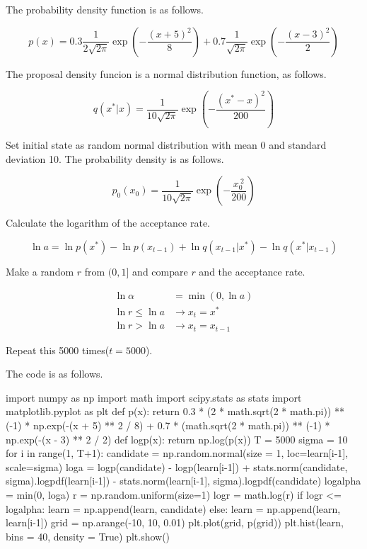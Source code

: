 \begin{example}

The probability density function is as follows.

\begin{equation}
    p(x) = 0.3 \frac{1}{2 \sqrt{2\pi}} \exp{\left(- \frac{(x + 5)^2}{8} \right)} + 0.7 \frac{1}{\sqrt{2\pi}} \exp{\left(- \frac{(x - 3)^2}{2} \right)}
\end{equation}

The proposal density funcion is a normal distribution function, as follows.

\begin{equation}
    q(x^* | x) = \frac{1}{10\sqrt{2\pi}} \exp{\left( -\frac{(x^* - x)^2}{200} \right)}
\end{equation}

Set initial state as random normal distribution with mean 0 and standard deviation 10. The probability density is as follows.

\begin{equation}
    p_0 (x_0) = \frac{1}{10\sqrt{2\pi}} \exp{\left( -\frac{x_0^{\ 2}}{200} \right)}
\end{equation}

Calculate the logarithm of the acceptance rate.

\begin{equation}
    \ln{a} = \ln{p(x^*)} - \ln{p(x_{t-1})} + \ln{q(x_{t-1} | x^*)} - \ln{q(x^* | x_{t-1})}
\end{equation}

Make a random $r$ from $(0,1]$ and compare $r$ and the acceptance rate.

\begin{align}
    \ln{\alpha} &= \min{(0, \ln{a})} \\
    \ln{r} \leq \ln{a} &\to x_{t} = x^* \\
    \ln{r} > \ln{a} &\to x_{t} = x_{t-1}
\end{align}

Repeat this 5000 times($t = 5000$).

The code is as follows.

\begin{python}[Python3]
import numpy as np
import math
import scipy.stats as stats
import matplotlib.pyplot as plt
def p(x):
    return 0.3 * (2 * math.sqrt(2 * math.pi)) ** (-1) * np.exp(-(x + 5) ** 2 / 8) + 0.7 * (math.sqrt(2 * math.pi)) ** (-1) * np.exp(-(x - 3) ** 2 / 2)
def logp(x):
    return np.log(p(x))
T = 5000
sigma = 10
for i in range(1, T+1):
    candidate = np.random.normal(size = 1, loc=learn[i-1], scale=sigma)
    loga = logp(candidate) - logp(learn[i-1]) + stats.norm(candidate, sigma).logpdf(learn[i-1]) - stats.norm(learn[i-1], sigma).logpdf(candidate)
    logalpha = min(0, loga)
    r = np.random.uniform(size=1)
    logr = math.log(r)
    if logr <= logalpha:
        learn = np.append(learn, candidate)
    else:
        learn = np.append(learn, learn[i-1])
grid = np.arange(-10, 10, 0.01)
plt.plot(grid, p(grid))
plt.hist(learn, bins = 40, density = True)
plt.show()
\end{python}


\end{example}
